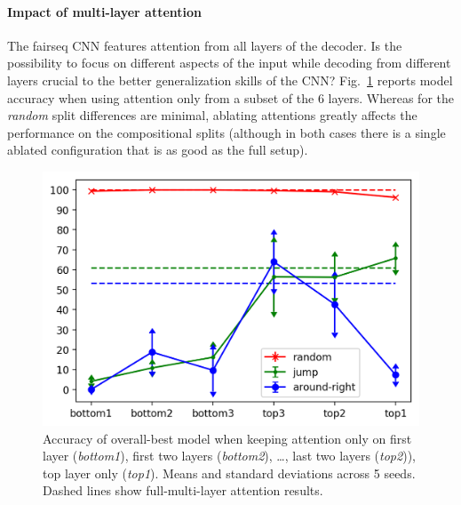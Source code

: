 \paragraph{Impact of multi-layer attention}
\label{subsec:exp3}

The fairseq CNN features attention from all layers of the
decoder. Is the possibility to focus on different aspects of the input
while decoding from different layers crucial to the better
generalization skills of the CNN? Fig.~\ref{fig:exp3} reports model
accuracy when using attention only from a subset of the 6
layers. Whereas for the \emph{random} split differences are minimal,
ablating attentions greatly affects the performance on the
compositional splits (although in both cases there is a single ablated
configuration that is as good as the full setup).

\begin{figure}[tb]
    \centering
    \includegraphics[width=.5\textwidth,keepaspectratio]{figures/attention_exp.png}
    \caption{Accuracy of overall-best model when keeping attention
      only on first layer (\emph{bottom1}), first two layers
      (\emph{bottom2}), \ldots, last two layers (\emph{top2})), top
      layer only (\emph{top1}). Means and standard deviations across 5
      seeds. Dashed lines show full-multi-layer attention results.}
    \label{fig:exp3}
\end{figure}

